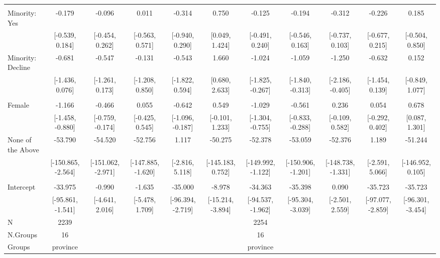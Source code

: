 \documentclass[
  10,
  letterpaper,
  DIV=11,
  numbers=noendperiod]{scrartcl}
\begin{document}
\begin{table}
\begin{tabular}[t]{lcccccccccc}
\addlinespace[0.3em]
\multicolumn{11}{l}{\cellcolor[HTML]{3498DB}{\textbf{Minority}}}\\
\hspace{1em}Minority: Yes & -0.179 & -0.096 & 0.011 & -0.314 & 0.750 & -0.125 & -0.194 & -0.312 & -0.226 & 0.185\\
\hspace{1em} & {}[-0.539, 0.184] & {}[-0.454, 0.262] & {}[-0.563, 0.571] & {}[-0.940, 0.290] & {}[0.049, 1.424] & {}[-0.491, 0.240] & {}[-0.546, 0.163] & {}[-0.737, 0.103] & {}[-0.677, 0.215] & {}[-0.504, 0.850]\\
\hspace{1em}Minority: Decline & -0.681 & -0.547 & -0.131 & -0.543 & 1.660 & -1.024 & -1.059 & -1.250 & -0.632 & 0.152\\
\hspace{1em} & {}[-1.436, 0.076] & {}[-1.261, 0.173] & {}[-1.208, 0.850] & {}[-1.822, 0.594] & {}[0.680, 2.633] & {}[-1.825, -0.267] & {}[-1.840, -0.313] & {}[-2.186, -0.405] & {}[-1.454, 0.139] & {}[-0.849, 1.077]\\
\addlinespace[0.3em]
\multicolumn{11}{l}{\cellcolor[HTML]{3498DB}{\textbf{Gender}}}\\
\hspace{1em}Female & -1.166 & -0.466 & 0.055 & -0.642 & 0.549 & -1.029 & -0.561 & 0.236 & 0.054 & 0.678\\
\hspace{1em} & {}[-1.458, -0.880] & {}[-0.759, -0.174] & {}[-0.425, 0.545] & {}[-1.096, -0.187] & {}[-0.101, 1.233] & {}[-1.304, -0.755] & {}[-0.833, -0.288] & {}[-0.109, 0.582] & {}[-0.292, 0.402] & {}[0.087, 1.301]\\
\hspace{1em}None of the Above & -53.790 & -54.520 & -52.756 & 1.117 & -50.275 & -52.378 & -53.059 & -52.376 & 1.189 & -51.244\\
\hspace{1em} & {}[-150.865, -2.564] & {}[-151.062, -2.971] & {}[-147.885, -1.620] & {}[-2.816, 5.118] & {}[-145.183, 0.752] & {}[-149.992, -1.122] & {}[-150.906, -1.201] & {}[-148.738, -1.331] & {}[-2.591, 5.066] & {}[-146.952, 0.105]\\
\addlinespace[0.3em]
\multicolumn{11}{l}{\cellcolor[HTML]{3498DB}{\textbf{Intercept}}}\\
\hspace{1em}Intercept & -33.975 & -0.990 & -1.635 & -35.000 & -8.978 & -34.363 & -35.398 & 0.090 & -35.723 & -35.723\\
\hspace{1em} & {}[-95.861, -1.541] & {}[-4.641, 2.016] & {}[-5.478, 1.709] & {}[-96.394, -2.719] & {}[-15.214, -3.894] & {}[-94.537, -1.962] & {}[-95.304, -3.039] & {}[-2.501, 2.559] & {}[-97.077, -2.859] & {}[-96.301, -3.454]\\
\midrule
N & 2239 &  &  &  &  & 2254 &  &  &  & \\
N.Groups & 16 &  &  &  &  & 16 &  &  &  & \\
Groups & province &  &  &  &  & province &  &  &  & \\
\bottomrule
\end{tabular}
\end{table}
\end{document}
